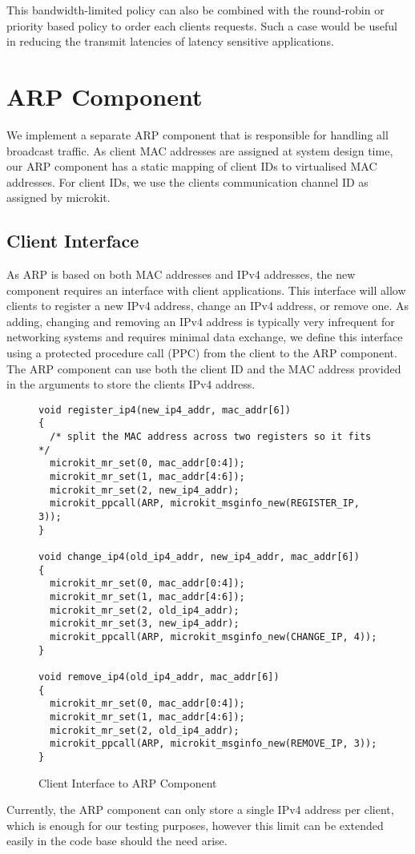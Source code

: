 This bandwidth-limited policy can also be combined with the round-robin or priority based policy
to order each clients requests. Such a case would be useful in reducing the 
transmit latencies of latency sensitive applications.\\ 

\section{ARP Component}

We implement a separate ARP component that is responsible for handling all broadcast traffic. 
As client MAC addresses are assigned at system design time, our ARP component has a static
mapping of client IDs to virtualised MAC addresses. For client IDs, we use the clients 
communication channel ID as assigned by microkit. 

\subsection{Client Interface}
As ARP is based on both MAC addresses and IPv4 addresses, the new component
requires an interface with client applications. This interface will allow clients
to register a new IPv4 address, change an IPv4 address, or remove one. As adding,
changing and removing an IPv4 address is typically very infrequent for networking systems
and requires minimal data exchange, we define this interface using a protected procedure
call (PPC) from the client to the ARP component. The ARP component can use both the
client ID and the MAC address provided in the arguments to store the clients IPv4 address. 

\begin{figure} [H]
    \begin{verbatim}
void register_ip4(new_ip4_addr, mac_addr[6])
{
  /* split the MAC address across two registers so it fits */
  microkit_mr_set(0, mac_addr[0:4]);
  microkit_mr_set(1, mac_addr[4:6]);
  microkit_mr_set(2, new_ip4_addr);
  microkit_ppcall(ARP, microkit_msginfo_new(REGISTER_IP, 3));
}

void change_ip4(old_ip4_addr, new_ip4_addr, mac_addr[6])
{
  microkit_mr_set(0, mac_addr[0:4]);
  microkit_mr_set(1, mac_addr[4:6]);
  microkit_mr_set(2, old_ip4_addr);
  microkit_mr_set(3, new_ip4_addr);
  microkit_ppcall(ARP, microkit_msginfo_new(CHANGE_IP, 4));
}  

void remove_ip4(old_ip4_addr, mac_addr[6])
{
  microkit_mr_set(0, mac_addr[0:4]);
  microkit_mr_set(1, mac_addr[4:6]);
  microkit_mr_set(2, old_ip4_addr);
  microkit_ppcall(ARP, microkit_msginfo_new(REMOVE_IP, 3));
}
\end{verbatim}
\caption{Client Interface to ARP Component}
\label{l:arpintf}
\end{figure}

Currently, the ARP component can only store a single IPv4 address per client, which
is enough for our testing purposes, however this limit can be extended easily in the code
base should the need arise.\\
